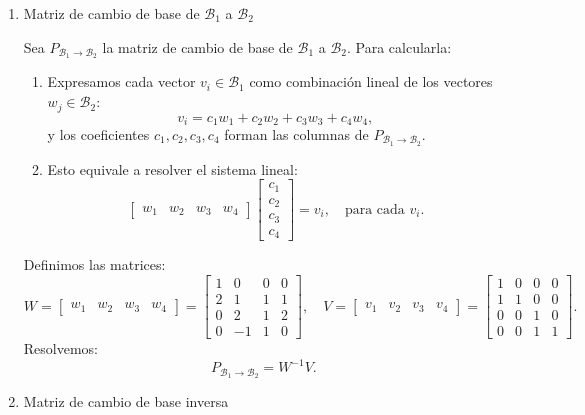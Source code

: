 \begin{enumerate}[label=\color{red}\textbf{\arabic*)}]
\begin{enumerate}[label=Paso \arabic*:]
    \item Matriz de cambio de base de $\mathcal{B}_1$ a $\mathcal{B}_2$ 

        Sea $P_{\mathcal{B}_1\to \mathcal{B}_2}$ la matriz de cambio de base de $\mathcal{B}_1$ a $\mathcal{B}_2$. Para calcularla:
        \begin{enumerate}[label=\arabic*)]
            \item Expresamos cada vector $v_i \in \mathcal{B}_1$ como combinación lineal de los vectores $w_j\in \mathcal{B}_2$: \[
            v_i=c_1w_1+c_2w_2+c_3w_3+c_4w_4,
            \] y los coeficientes $c_1,c_2,c_3,c_4$ forman las columnas de $P_{\mathcal{B}_1\to \mathcal{B}_2}$.
        \item Esto equivale a resolver el sistema lineal: \[
        \begin{bmatrix} 
            w_1 & w_2 & w_3 & w_4 
        \end{bmatrix} \begin{bmatrix} 
         c_1\\ c_2\\ c_3\\ c_4
        \end{bmatrix} =v_i,\quad \text{para cada $v_i$.}
        \] 

        \end{enumerate}
        Definimos las matrices: \[
        W=\begin{bmatrix} 
            w_1 & w_2 & w_3 & w_4 
        \end{bmatrix} =\begin{bmatrix} 
            1 & 0 & 0 & 0\\
            2 & 1 & 1 & 1\\
            0 & 2 & 1 & 2\\
            0 & -1 & 1 & 0
        \end{bmatrix} ,\quad V=\begin{bmatrix} 
            v_1 & v_2 & v_3 & v_4 
        \end{bmatrix} =\begin{bmatrix} 
            1 & 0 & 0 & 0\\
            1 & 1 & 0 & 0\\
            0 & 0 & 1 & 0\\
            0 & 0 & 1 & 1
        \end{bmatrix} .
        \] 
        Resolvemos: \[
        P_{\mathcal{B}_1\to \mathcal{B}_2}=W^{-1}V.
        \] 
    \item Matriz de cambio de base inversa


\end{enumerate}
\end{enumerate}
